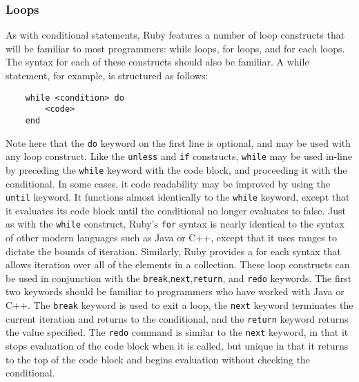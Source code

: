 \documentclass[12pt]{article}
\begin{document}
\subsubsection{Loops}
As with conditional statements, Ruby features a number of loop constructs that will be familiar to most programmers: while loops, for loops, and for each loops. The syntax for each of these constructs should also be familiar. A while statement, for example, is structured as follows:
\begin{lstlisting}
    while <condition> do
        <code>
    end
\end{lstlisting}
Note here that the \verb|do| keyword on the first line is optional, and may be used with any loop construct\cite{ctrl_struct}. 
Like the \verb|unless| and \verb|if| constructs, \verb|while| may be used in-line by preceding the \verb|while| keyword with the code block, and proceeding it with the conditional. In some cases, it code readability may be improved by using the \verb|until| keyword. It functions almost identically to the \verb|while| keyword, except that it evaluates its code block until the conditional no longer evaluates to false\cite{ctrl_struct}.
Just as with the \verb|while| construct, Ruby's \verb|for| syntax is nearly identical to the syntax of other modern languages such as Java or C++, except that it uses ranges to dictate the bounds of iteration. Similarly, Ruby provides a for each syntax that allows iteration over all of the elements in a collection\cite{flow_control}.
These loop constructs can be used in conjunction with the \verb|break|,\verb|next|,\verb|return|, and \verb|redo| keywords. The first two keywords should be familiar to programmers who have worked with Java or C++. The \verb|break| keyword is used to exit a loop, the \verb|next| keyword terminates the current iteration and returns to the conditional, and the \verb|return| keyword returns the value specified. The \verb|redo| command is similar to the \verb|next| keyword, in that it stops evaluation of the code block when it is called, but unique in that it returns to the top of the code block and begins evaluation without checking the conditional\cite{flow_control}.
\end{document}
